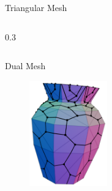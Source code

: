 \documentclass{beamer}
\begin{document}
\begin{frame}{Triangular Mesh}
\begin{columns}
\begin{column}{0.3\pagewidth}
\begin{figure}
        \end{figure}
    \end{column}
    \end{columns}
\end{frame}

\begin{frame}{Dual Mesh}
    \begin{figure}
        \centering
        \includegraphics[width=0.3\textwidth]{vase_dual.png}
    \end{figure}
\end{frame}
\end{document}
